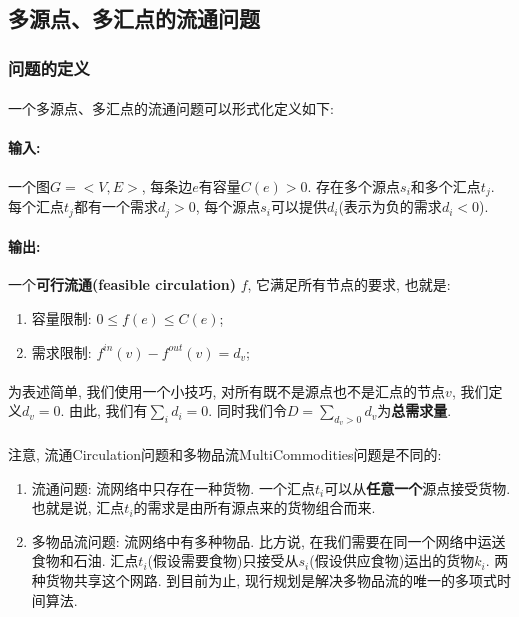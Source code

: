 	
	\subsection{多源点、多汇点的流通问题}
	    \subsubsection{问题的定义}
	    \paragraph{}一个多源点、多汇点的流通问题可以形式化定义如下:
        \paragraph{输入:}一个图$G=<V, E>$, 每条边$e$有容量$C(e) > 0$. 存在多个源点$s_i$和多个汇点$t_j$. 每个汇点$t_j$都有一个需求$d_j > 0$, 每个源点$s_i$可以提供$d_i$(表示为负的需求$d_i < 0$).
        \paragraph{输出:}一个{\bf 可行流通(feasible circulation)} $f$, 它满足所有节点的要求, 也就是:
        \begin{enumerate}
        \item{容量限制:}  $0 \leq f(e) \leq C(e)$;
        \item{需求限制:}  $f^{in} (v) - f^{out} (v) = d_v$;
        \end{enumerate}
	    \paragraph{}为表述简单, 我们使用一个小技巧, 对所有既不是源点也不是汇点的节点$v$, 我们定义$d_v=0$. 由此, 我们有$\sum_i d_i = 0$. 同时我们令$D=\sum_{d_v >0 } d_v$为{\bf 总需求量}.
	    \paragraph{}注意, 流通{\sc Circulation}问题和多物品流{\sc MultiCommodities}问题是不同的: 
        \begin{enumerate}
        \item  {\sc 流通}问题: 流网络中只存在一种货物. 一个汇点$t_{i}$可以从{\bf 任意一个}源点接受货物. 也就是说, 汇点$t_{i}$的需求是由所有源点来的货物组合而来.
        \item {\sc 多物品流}问题: 流网络中有多种物品. 比方说, 在我们需要在同一个网络中运送食物和石油. 汇点$t_i$(假设需要食物)只接受从$s_i$(假设供应食物)运出的货物$k_i$. 两种货物共享这个网路. 到目前为止, 现行规划是解决多物品流的唯一的多项式时间算法.
        \end{enumerate}
